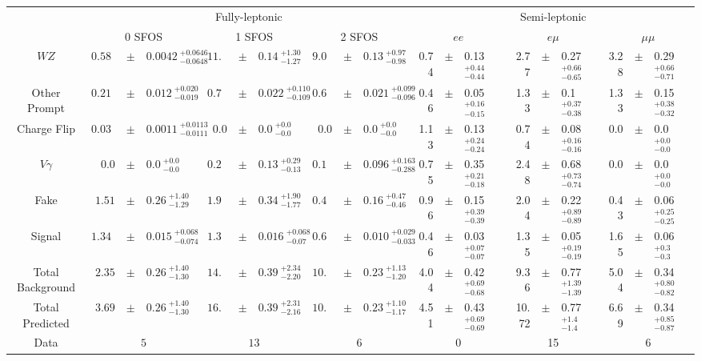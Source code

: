 \small
\renewcommand{\tabcolsep}{1pt}
\def\arraystretch{1.3}
\begin{tabular}{c||rcl|rcl|rcl|rcl|rcl|rcl}
\hline
 & \multicolumn{9}{c|}{Fully-leptonic} & \multicolumn{9}{c}{Semi-leptonic} \\
 & \multicolumn{3}{c|}{0 SFOS} & \multicolumn{3}{|c|}{1 SFOS} & \multicolumn{3}{|c|}{2 SFOS} & \multicolumn{3}{|c|}{$ee$} & \multicolumn{3}{|c|}{$e\mu$} & \multicolumn{3}{|c}{$\mu\mu$}\\ 
\hline\hline
$WZ$ &  $0.5860 $&$\pm$&$ 0.0042~^{+0.0646}_{-0.0648}$ &  $11.89 $&$\pm$&$ 0.14~^{+1.30}_{-1.27}$ &  $9.05 $&$\pm$&$ 0.13~^{+0.97}_{-0.98}$ & 0.74 &$\pm$&  0.13 $^{+0.44}_{-0.44}$  & 2.77 &$\pm$&  0.27 $^{+0.66}_{-0.65}$  & 3.28 &$\pm$&  0.29 $^{+0.66}_{-0.71}$ \\[0.2cm] 
Other Prompt &  $0.214 $&$\pm$&$ 0.012~^{+0.020}_{-0.019}$ &  $0.780 $&$\pm$&$ 0.022~^{+0.110}_{-0.109}$ &  $0.602 $&$\pm$&$ 0.021~^{+0.099}_{-0.096}$ & 0.46 &$\pm$&  0.05 $^{+0.16}_{-0.15}$  & 1.33 &$\pm$&  0.1 $^{+0.37}_{-0.38}$  & 1.33 &$\pm$&  0.15 $^{+0.38}_{-0.32}$ \\[0.2cm] 
Charge Flip &  $0.0350 $&$\pm$&$ 0.0011~^{+0.0113}_{-0.0111}$ &  $0.0 $&$\pm$&$ 0.0~^{+0.0}_{-0.0}$ &  $0.0 $&$\pm$&$ 0.0~^{+0.0}_{-0.0}$ & 1.13 &$\pm$&  0.13 $^{+0.24}_{-0.24}$  & 0.74 &$\pm$&  0.08 $^{+0.16}_{-0.16}$  & 0.0 &$\pm$&  0.0 $^{+0.0}_{-0.0}$ \\[0.2cm] 
$V\gamma$ &  $0.0 $&$\pm$&$ 0.0~^{+0.0}_{-0.0}$ &  $0.20 $&$\pm$&$ 0.13~^{+0.29}_{-0.13}$ &  $0.110 $&$\pm$&$ 0.096~^{+0.163}_{-0.288}$ & 0.75 &$\pm$&  0.35 $^{+0.21}_{-0.18}$  & 2.48 &$\pm$&  0.68 $^{+0.73}_{-0.74}$  & 0.0 &$\pm$&  0.0 $^{+0.0}_{-0.0}$ \\[0.2cm] 
Fake &  $1.51 $&$\pm$&$ 0.26~^{+1.40}_{-1.29}$ &  $1.90 $&$\pm$&$ 0.34~^{+1.90}_{-1.77}$ &  $0.49 $&$\pm$&$ 0.16~^{+0.47}_{-0.46}$ & 0.96 &$\pm$&  0.15 $^{+0.39}_{-0.39}$  & 2.04 &$\pm$&  0.22 $^{+0.89}_{-0.89}$  & 0.43 &$\pm$&  0.06 $^{+0.25}_{-0.25}$ \\[0.2cm] 
Signal &  $1.344 $&$\pm$&$ 0.015~^{+0.068}_{-0.074}$ &  $1.394 $&$\pm$&$ 0.016~^{+0.068}_{-0.07}$ &  $0.614 $&$\pm$&$ 0.010~^{+0.029}_{-0.033}$ 
& 0.46 &$\pm$& 0.03 $^{+0.07}_{-0.07}$  & 1.35 &$\pm$& 0.05 $^{+0.19}_{-0.19}$  & 1.65 &$\pm$& 0.06 $^{+0.3}_{-0.3}$ \\[0.2cm] 
\hline
Total Background &  $2.35 $&$\pm$&$ 0.26~^{+1.40}_{-1.30}$ &  $14.77 $&$\pm$&$ 0.39~^{+2.34}_{-2.20}$ &  $10.25 $&$\pm$&$ 0.23~^{+1.13}_{-1.20}$ & 4.04 &$\pm$&  0.42 $^{+0.69}_{-0.68}$  & 9.36 &$\pm$&  0.77 $^{+1.39}_{-1.39}$  & 5.04 &$\pm$&  0.34 $^{+0.80}_{-0.82}$ \\[0.2cm] 
Total Predicted &  $3.69 $&$\pm$&$ 0.26~^{+1.40}_{-1.30}$ &  $16.16 $&$\pm$&$ 0.39~^{+2.31}_{-2.16}$ &  $10.86 $&$\pm$&$ 0.23~^{+1.10}_{-1.17}$ 
& 4.51 &$\pm$& 0.43 $^{+0.69}_{-0.69}$  & 10.72 &$\pm$& 0.77 $^{+1.4}_{-1.4}$  & 6.69 &$\pm$& 0.34 $^{+0.85}_{-0.87}$ \\ \hline 
\hline
Data &  \multicolumn{3}{c|}{$5$} &  \multicolumn{3}{|c|}{$13$} &  \multicolumn{3}{|c|}{$6$} & \multicolumn{3}{|c|}{0} & \multicolumn{3}{|c|}{15} & \multicolumn{3}{|c}{6}\\ 
\hline
\end{tabular}






